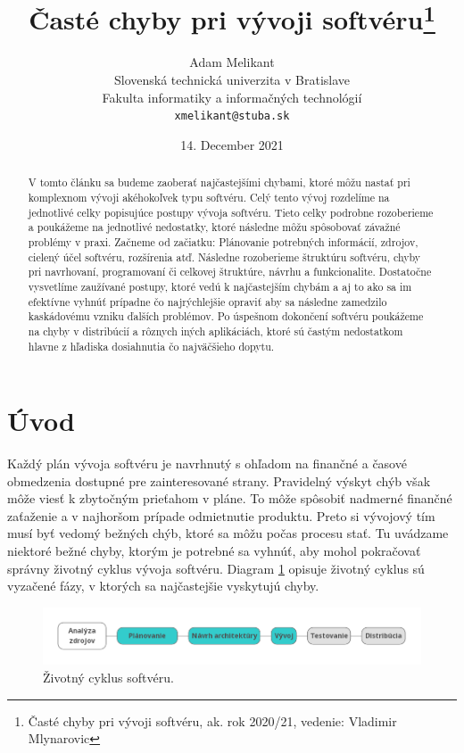 \documentclass[10pt,twoside,slovak,a4paper]{article}
\title{Časté chyby pri vývoji softvéru\thanks{Časté chyby pri vývoji softvéru, ak. rok 2020/21, vedenie: Vladimir Mlynarovic}} %
\author{Adam Melikant\\[2pt]
	{\small Slovenská technická univerzita v Bratislave}\\
	{\small Fakulta informatiky a informačných technológií}\\
	{\small \texttt{xmelikant@stuba.sk}}
	}
\date{\small 14. December 2021} %
\begin{document}
\maketitle

\begin{abstract}
V tomto článku sa budeme zaoberať najčastejšími chybami, ktoré môžu nastať pri komplexnom vývoji akéhokoľvek typu softvéru. Celý tento vývoj rozdelíme na jednotlivé celky popisujúce postupy vývoja softvéru. Tieto celky podrobne rozoberieme a poukážeme na jednotlivé nedostatky, ktoré následne môžu spôsobovať závažné problémy v praxi. Začneme od začiatku: Plánovanie potrebných informácií, zdrojov, cielený účel softvéru, rozšírenia atď. Následne rozoberieme štruktúru softvéru, chyby pri navrhovaní, programovaní či celkovej štruktúre, návrhu a funkcionalite. Dostatočne vysvetlíme zaužívané postupy, ktoré vedú k najčastejším chybám a aj to ako sa im efektívne vyhnúť prípadne čo najrýchlejšie opraviť aby sa následne zamedzilo kaskádovému vzniku ďalších problémov. Po úspešnom dokončení softvéru poukážeme na chyby v distribúcií a rôznych iných aplikáciách, ktoré sú častým nedostatkom hlavne z hľadiska dosiahnutia čo najväčšieho dopytu.
\end{abstract}


\section{Úvod}
Každý plán vývoja softvéru je navrhnutý s ohľadom na finančné a časové obmedzenia dostupné pre zainteresované strany. Pravidelný výskyt chýb však môže viesť k zbytočným prieťahom v pláne. To môže spôsobiť nadmerné finančné zaťaženie a v najhoršom prípade odmietnutie produktu. Preto si vývojový tím musí byť vedomý bežných chýb, ktoré sa môžu počas procesu stať. Tu uvádzame niektoré bežné chyby, ktorým je potrebné sa vyhnúť, aby mohol pokračovať správny životný cyklus vývoja softvéru.%
Diagram \ref{fig:D1} opisuje životný cyklus sú vyzačené fázy, v ktorých sa najčastejšie vyskytujú chyby.
\begin{figure}[h]
    \centering
    \includegraphics[scale=0.35]{vyvoj_diagram.png}
    \caption{Životný cyklus softvéru.}
    \label{fig:D1}
\end{figure}
\end{document}
